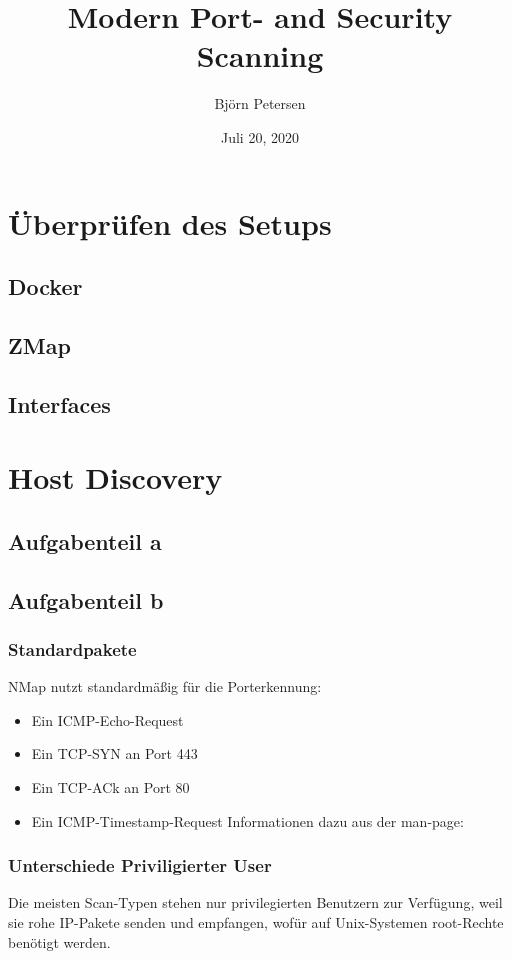 \documentclass[a4paper,12pt,
headsepline,           %
oneside,               %
pointlessnumbers,      %
bibtotoc,              %
BCOR15mm               %
]{scrbook}
\title{Modern Port- and Security Scanning}
\date{Juli 20, 2020}
\author{Björn Petersen}
\begin{document}
\maketitle

\section*{Überprüfen des Setups}

\subsection*{Docker}


\subsection*{ZMap}


\subsection*{Interfaces}


\section*{Host Discovery}
\subsection*{Aufgabenteil a}


\subsection*{Aufgabenteil b}
\subsubsection*{Standardpakete}
NMap nutzt standardmäßig für die Porterkennung:
\begin{itemize}
  \item Ein ICMP-Echo-Request
  \item Ein TCP-SYN an Port 443
  \item Ein TCP-ACk an Port 80
  \item Ein ICMP-Timestamp-Request Informationen dazu aus der man-page:
\end{itemize}

\subsubsection*{Unterschiede Priviligierter User}
Die meisten Scan-Typen stehen nur privilegierten Benutzern zur Verfügung, weil sie rohe IP-Pakete senden und empfangen, wofür auf Unix-Systemen root-Rechte benötigt werden. 
\end{document}
